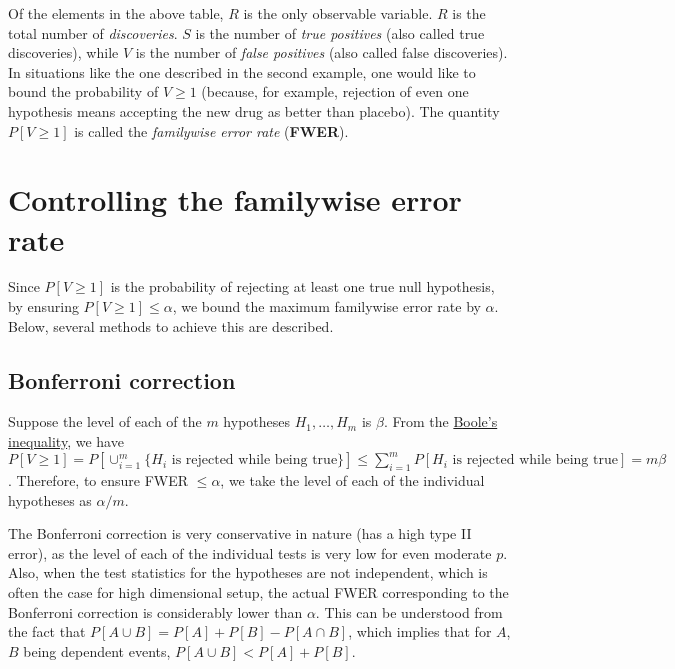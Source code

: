 \documentclass[
]{book}
\begin{document}
Of the elements in the above table, \(R\) is the only observable variable. \(R\) is the total number of \emph{discoveries}. \(S\) is the number of \emph{true positives} (also called true discoveries), while \(V\) is the number of \emph{false positives} (also called false discoveries). In situations like the one described in the second example, one would like to bound the probability of \(V \ge 1\) (because, for example, rejection of even one hypothesis means accepting the new drug as better than placebo). The quantity \(P[ V \ge 1 ]\) is called the \emph{familywise error rate} (\textbf{FWER}).

\hypertarget{FWER}{%
\section{Controlling the familywise error rate}\label{FWER}}

Since \(P[ V \ge 1 ]\) is the probability of rejecting at least one true null hypothesis, by ensuring \(P[ V \ge 1 ] \le \alpha\), we bound the maximum familywise error rate by \(\alpha\). Below, several methods to achieve this are described.

\hypertarget{bonferroni}{%
\subsection{Bonferroni correction}\label{bonferroni}}

Suppose the level of each of the \(m\) hypotheses \(H_1, \ldots, H_m\) is \(\beta\). From the \href{https://en.wikipedia.org/wiki/Boole\%27s_inequality}{Boole's inequality}, we have \(P[ V \ge 1 ] = P\left[ \cup_{i=1}^{m} \{H_i \text{ is rejected while being true}\} \right] \le \sum_{i=1}^{m} P[H_i \text{ is rejected while being true}] = m \beta\). Therefore, to ensure FWER \(\le \alpha\), we take the level of each of the individual hypotheses as \(\alpha / m\).

The Bonferroni correction is very conservative in nature (has a high type II error), as the level of each of the individual tests is very low for even moderate \(p\). Also, when the test statistics for the hypotheses are not independent, which is often the case for high dimensional setup, the actual FWER corresponding to the Bonferroni correction is considerably lower than \(\alpha\). This can be understood from the fact that \(P[A \cup B] = P[A] + P[B] - P[A \cap B]\), which implies that for \(A\), \(B\) being dependent events, \(P[A \cup B] < P[A] + P[B]\).
\end{document}
